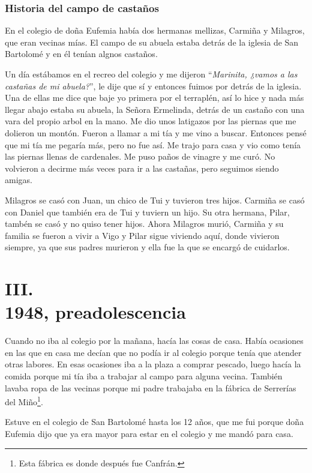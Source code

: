 \documentclass[12pt,a5paper]{book}
\begin{document}
\subsubsection*{Historia del campo de castaños}

En el colegio de doña Eufemia había dos hermanas mellizas, Carmiña y Milagros, que eran vecinas mías. El campo de su abuela estaba detrás de la iglesia de San Bartolomé y en él tenían algnos castaños. 

Un día estábamos en el recreo del colegio y me dijeron ``\textit{Marinita, ¿vamos a las castañas de mi abuela?}'', le dije que sí y entonces fuimos por detrás de la iglesia. Una de ellas me dice que baje yo primera por el terraplén, así lo hice y nada más llegar abajo estaba su abuela, la Señora Ermelinda, detrás de un castaño con una vara del propio arbol en la mano. Me dio unos latigazos por las piernas que me dolieron un montón. Fueron a llamar a mi tía y me vino a buscar. Entonces pensé que mi tía me pegaría más, pero no fue así. Me trajo para casa y vio como tenía las piernas llenas de cardenales. Me puso paños de vinagre y me curó. No volvieron a decirme más veces para ir a las castañas, pero seguimos siendo amigas. 

Milagros se casó con Juan, un chico de Tui y tuvieron tres hijos. Carmiña se casó con Daniel que también era de Tui y tuviern un hijo. Su otra hermana, Pilar, tambén se casó y no quiso tener hijos. Ahora Milagros murió, Carmiña y su familia se fueron a vivir a Vigo y Pilar sigue viviendo aquí, donde vivieron siempre, ya que sus padres murieron y ella fue la que se encargó de cuidarlos.



\section*{III.\\1948, preadolescencia}

Cuando no iba al colegio por la mañana, hacía las cosas de casa. Había ocasiones en las que en casa me decían que no podía ir al colegio porque tenía que atender otras labores. En esas ocasiones iba a la plaza a comprar pescado, luego hacía la comida porque mi tía iba a trabajar al campo para alguna vecina. También lavaba ropa de las vecinas porque mi padre trabajaba en la fábrica de Serrerías del Miño\footnote{Esta fábrica es donde después fue Canfrán.}. 

Estuve en el colegio de San Bartolomé hasta los 12 años, que me fui porque doña Eufemia dijo que ya era mayor para estar en el colegio y me mandó para casa.
\end{document}
